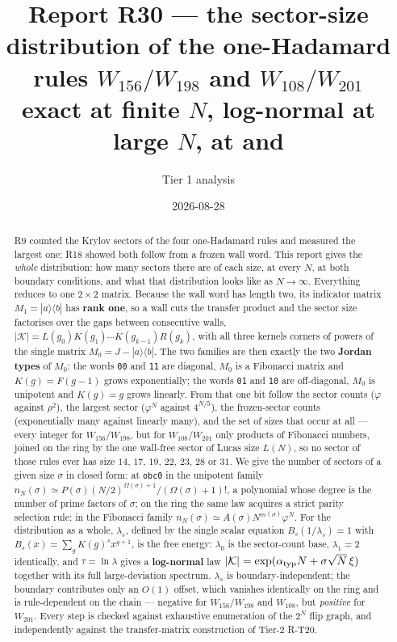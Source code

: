 \documentclass[11pt]{article}
\title{\textbf{Report R30 --- the sector-size distribution of the
one-Hadamard rules $W_{156}/W_{198}$ and $W_{108}/W_{201}$}\\
\large exact at finite $N$, log-normal at large $N$, at \rt{obc0} and \rt{pbc}}
\author{Tier 1 analysis}
\date{2026-08-28}
\newcommand{\rt}[1]{\texttt{#1}}
\newcommand{\K}{\mathcal{K}}
\theoremstyle{plain}
\theoremstyle{remark}
\begin{document}
\maketitle

\begin{abstract}
R9 counted the Krylov sectors of the four one-Hadamard rules and measured the
largest one; R18 showed both follow from a frozen wall word. This report gives
the \emph{whole} distribution: how many sectors there are of each size, at every
$N$, at both boundary conditions, and what that distribution looks like as
$N\to\infty$. Everything reduces to one $2\times2$ matrix. Because the wall word
has length two, its indicator matrix $M_1=|a\rangle\langle b|$ has \textbf{rank
one}, so a wall cuts the transfer product and the sector size factorises over
the gaps between consecutive walls,
$|\K| = L(g_0)K(g_1)\cdots K(g_{k-1})R(g_k)$, with all three kernels corners of
powers of the single matrix $M_0 = J - |a\rangle\langle b|$. The two families are
then exactly the two \textbf{Jordan types} of $M_0$: the words \rt{00} and
\rt{11} are diagonal, $M_0$ is a Fibonacci matrix and $K(g)=F(g-1)$ grows
exponentially; the words \rt{01} and \rt{10} are off-diagonal, $M_0$ is
unipotent and $K(g)=g$ grows linearly. From that one bit follow the sector
counts ($\varphi$ against $\rho^2$), the largest sector ($\varphi^N$ against
$4^{N/5}$), the frozen-sector counts (exponentially many against linearly many),
and the set of sizes that occur at all --- every integer for
$W_{156}/W_{198}$, but for $W_{108}/W_{201}$ only products of Fibonacci numbers,
joined on the ring by the one wall-free sector of Lucas size $L(N)$, so no sector
of those rules ever has size $14$, $17$, $19$, $22$, $23$, $28$ or $31$.
We give the number of sectors of a given size $\sigma$ in closed form: at
\rt{obc0} in the unipotent family
$n_N(\sigma)\simeq P(\sigma)(N/2)^{\Omega(\sigma)+1}/(\Omega(\sigma)+1)!$, a
polynomial whose degree is the number of prime factors of $\sigma$; on the ring
the same law acquires a strict parity selection rule; in the Fibonacci family
$n_N(\sigma)\simeq A(\sigma)N^{m(\sigma)}\varphi^N$. For the distribution as a
whole, $\lambda_s$, defined by the single scalar equation $B_s(1/\lambda_s)=1$
with $B_s(x)=\sum_g K(g)^sx^{g+1}$, is the free energy: $\lambda_0$ is the
sector-count base, $\lambda_1=2$ identically, and $\tau=\ln\lambda$ gives a
\textbf{log-normal} law $|\K| = \exp(\alpha_{\rm typ}N + \sigma\sqrt{N}\,\xi)$
together with its full large-deviation spectrum. $\lambda_s$ is
boundary-independent; the boundary contributes only an $O(1)$ offset, which
vanishes identically on the ring and is rule-dependent on the chain --- negative
for $W_{156}/W_{198}$ and $W_{108}$, but \emph{positive} for $W_{201}$.
Every step is checked against exhaustive enumeration of the $2^N$ flip graph,
and independently against the transfer-matrix construction of Tier-2 R-T20.
\end{abstract}
\end{document}
